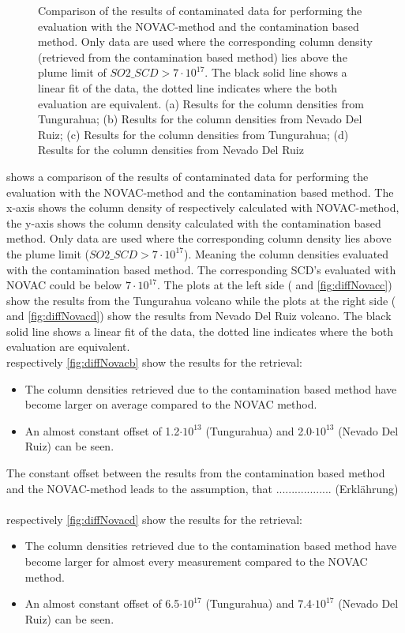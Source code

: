 \documentclass  [
  paper    = a4,
  BCOR     = 10mm,
  twoside,
  fontsize = 12pt,
  fleqn,
  toc      = bibnumbered,
  toc      = listofnumbered,
  numbers  = noendperiod,
  headings = normal,
  listof   = leveldown,
  version  = 3.03
]                                       {scrreprt}
\begin{document}
\begin{figure}[h!]
{		\label{fig:diffNovacd}}
		\caption{Comparison of the results of contaminated data for performing the evaluation with the NOVAC-method and the contamination based method. Only data are used where the corresponding   column density (retrieved from the contamination based method) lies above the plume limit of $SO2\_SCD>7\cdot 10^{17}$. The black solid line shows a linear fit of the data, the dotted line indicates where the both evaluation are equivalent. (a) Results for the   column densities from Tungurahua; (b) Results for the   column densities from Nevado Del Ruiz; (c) Results for the   column densities from Tungurahua; (d) Results for the   column densities from Nevado Del Ruiz}
		\label{fig:diffNovac}
	\end{figure}
	 shows a comparison of the results of contaminated data for performing the evaluation with the NOVAC-method and the contamination based method. The x-axis shows the column density of   respectively   calculated with NOVAC-method, the y-axis shows the column density calculated with the contamination based method. Only data are used where the corresponding   column density lies above the plume limit ($SO2\_SCD>7\cdot 10^{17}$). Meaning the column densities evaluated with the contamination based method. The corresponding   SCD's evaluated with NOVAC could be below $7\cdot 10^{17}$.
	The plots at the left side ( and \ref{fig:diffNovacc}) show the results from the Tungurahua volcano while the plots at the right side ( and \ref{fig:diffNovacd}) show the results from Nevado Del Ruiz volcano. The black solid line shows a linear fit of the data, the dotted line indicates where the both evaluation are equivalent.\\
	 respectively \ref{fig:diffNovacb} show the results for the   retrieval:
	\begin{itemize}
		\item The   column densities retrieved due to the contamination based method have become larger on average compared to the NOVAC method.
		\item An almost constant offset of 1.2$\cdot 10 ^{13}$ (Tungurahua) and 2.0$\cdot 10 ^{13}$ (Nevado Del Ruiz) can be seen.
	\end{itemize}
	The constant offset between the results from the contamination based method and the NOVAC-method leads to the assumption, that .................. (Erklährung)\\
	\\ 
	  respectively \ref{fig:diffNovacd} show the results for the   retrieval:
	\begin{itemize}
		\item The   column densities retrieved due to the contamination based method have become larger for almost every measurement compared to the NOVAC method.
		\item An almost constant offset of 6.5$\cdot 10 ^{17}$ (Tungurahua) and 7.4$\cdot 10 ^{17}$ (Nevado Del Ruiz) can be seen.
	\end{itemize}
\end{document}
